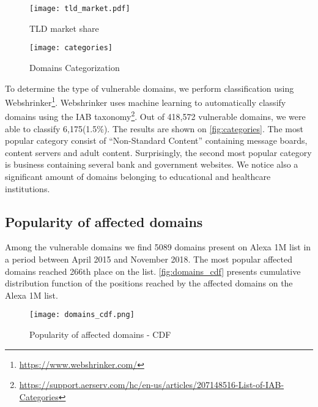 \begin{figure}[!hbt]
\centering
\texttt{[image: tld\_market.pdf]}
\caption{TLD market share}
\label{fig:tld_market}
\end{figure}



\begin{figure}[!hbt]
\centering
\texttt{[image: categories]}
\caption{Domains Categorization}
\label{fig:categories}
\end{figure}

To determine the type of vulnerable domains, we perform classification using Webshrinker\footnote{\url{https://www.webshrinker.com/}}. Webshrinker uses machine learning to automatically classify domains using the IAB taxonomy\footnote{\url{https://support.aerserv.com/hc/en-us/articles/207148516-List-of-IAB-Categories}}. Out of 418,572 vulnerable domains, we were able to classify 6,175(1.5\%). 
The results are shown on \autoref{fig:categories}. The most popular category consist of ``Non-Standard Content'' containing message boards, content servers and adult content. Surprisingly, the second most popular category is business containing several bank and government websites. We notice also a significant amount of domains belonging to educational and healthcare institutions. 

\subsection{Popularity of affected domains}

Among the vulnerable domains we find 5089 domains present on Alexa 1M list in a period between April 2015 and November 2018. The most popular affected domains reached 266th place on the list. \autoref{fig:domains_cdf} presents cumulative distribution function of the positions reached  by the affected domains on the Alexa 1M list. 


\begin{figure}[!hbt]
\centering
\texttt{[image: domains\_cdf.png]}
\caption{Popularity of affected domains - CDF}
\label{fig:domains_cdf}
\end{figure}
